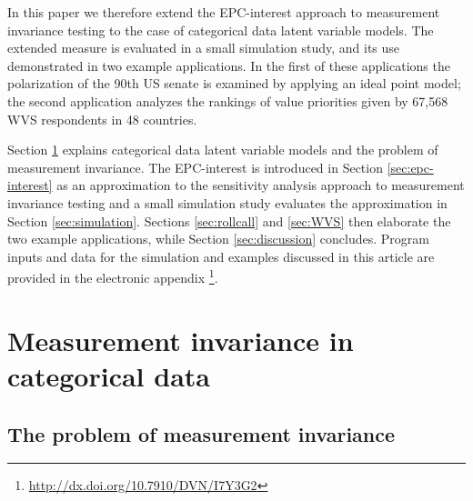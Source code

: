 \documentclass[letterpaper,12pt]{article}
\begin{document}

In this paper we therefore extend the EPC-interest approach to measurement invariance testing  to  the case of categorical data latent variable models. The extended measure is evaluated in a small simulation study, and its use demonstrated in two example applications. In the first of these applications the polarization of the 90th US senate is examined by applying an ideal point model; the second application analyzes the rankings of value priorities given by 67,568 WVS respondents in 48 countries. 


\bigskip
Section \ref{sec:invariance} explains categorical data latent variable models  and the problem of measurement invariance. The EPC-interest is introduced in Section \ref{sec:epc-interest} as an approximation to the sensitivity analysis approach to measurement invariance testing and a small simulation study evaluates the approximation in Section \ref{sec:simulation}. Sections \ref{sec:rollcall} and \ref{sec:WVS} then elaborate the two example applications, while Section \ref{sec:discussion} concludes. 
Program inputs and data for the simulation and examples discussed in this article are provided in the electronic appendix \citep{oberski2015replication}\footnote{\url{http://dx.doi.org/10.7910/DVN/I7Y3G2}}.


\section{Measurement invariance in categorical data}
\label{sec:invariance}
\subsection{The problem of measurement invariance}
\end{document}
